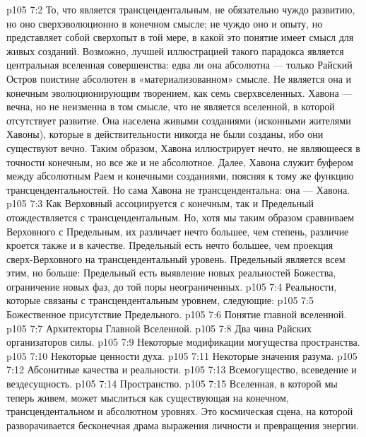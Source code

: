 \vs p105 7:2 То, что является трансцендентальным, не обязательно чуждо развитию, но оно сверхэволюционно в конечном смысле; не чуждо оно и опыту, но представляет собой сверхопыт в той мере, в какой это понятие имеет смысл для живых созданий. Возможно, лучшей иллюстрацией такого парадокса является центральная вселенная совершенства: едва ли она абсолютна --- только Райский Остров поистине абсолютен в «материализованном» смысле. Не является она и конечным эволюционирующим творением, как семь сверхвселенных. Хавона --- вечна, но не неизменна в том смысле, что не является вселенной, в которой отсутствует развитие. Она населена живыми созданиями (исконными жителями Хавоны), которые в действительности никогда не были созданы, ибо они существуют вечно. Таким образом, Хавона иллюстрирует нечто, не являющееся в точности конечным, но все же и не абсолютное. Далее, Хавона служит буфером между абсолютным Раем и конечными созданиями, поясняя к тому же функцию трансцендентальностей. Но сама Хавона не трансцендентальна: она --- Хавона.
\vs p105 7:3 Как Верховный ассоциируется с конечным, так и Предельный отождествляется с трансцендентальным. Но, хотя мы таким образом сравниваем Верховного с Предельным, их различает нечто большее, чем степень, различие кроется также и в качестве. Предельный есть нечто большее, чем проекция сверх\hyp{}Верховного на трансцендентальный уровень. Предельный является всем этим, но больше: Предельный есть выявление новых реальностей Божества, ограничение новых фаз, до той поры неограниченных.
\vs p105 7:4 \pc Реальности, которые связаны с трансцендентальным уровнем, следующие:
\vs p105 7:5 \bibnobreakspace Божественное присутствие Предельного.
\vs p105 7:6 \bibnobreakspace Понятие главной вселенной.
\vs p105 7:7 \bibnobreakspace Архитекторы Главной Вселенной.
\vs p105 7:8 \bibnobreakspace Два чина Райских организаторов силы.
\vs p105 7:9 \bibnobreakspace Некоторые модификации могущества пространства.
\vs p105 7:10 \bibnobreakspace Некоторые ценности духа.
\vs p105 7:11 \bibnobreakspace Некоторые значения разума.
\vs p105 7:12 \bibnobreakspace Абсонитные качества и реальности.
\vs p105 7:13 \bibnobreakspace Всемогущество, всеведение и вездесущность.
\vs p105 7:14 \bibnobreakspace Пространство.
\vs p105 7:15 \pc Вселенная, в которой мы теперь живем, может мыслиться как существующая на конечном, трансцендентальном и абсолютном уровнях. Это космическая сцена, на которой разворачивается бесконечная драма выражения личности и превращения энергии.
